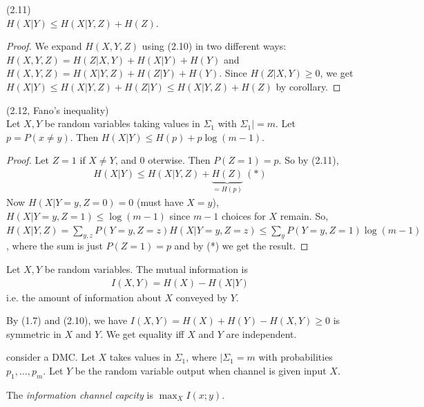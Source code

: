 \documentclass[a4paper]{article}
\begin{document}
\begin{lemma} (2.11)\\
$H(X|Y) \leq H(X|Y,Z) + H(Z)$.
\begin{proof}
We expand $H(X,Y,Z)$ using (2.10) in two different ways:
$H(X,Y,Z) = H(Z|X,Y)+H(X|Y)+H(Y)$ and $H(X,Y,Z)=H(X|Y,Z)+H(Z|Y)+H(Y)$. Since $H(Z|X,Y)\geq 0$, we get $H(X|Y)\leq H(X|Y,Z)+H(Z|Y)\leq H(X|Y,Z)+H(Z)$ by corollary.
\end{proof}
\end{lemma}

\begin{lemma} (2.12, Fano's inequality)\\
Let $X,Y$ be random variables taking values in $\Sigma_1$ with $\Sigma_1 | = m$. Let $p = P(x \neq y)$. Then $H(X|Y) \leq H(p) + p\log (m-1)$.
\begin{proof}
Let $Z=1$ if $X\neq Y$, and 0 oterwise. Then $P(Z=1) = p$. So by (2.11),
\begin{equation*}
\begin{aligned}
H(X|Y) \leq H(X|Y,Z)+\underbrace{H(Z)}_{=H(p)} \ (*)
\end{aligned}
\end{equation*}
Now $H(X|Y=y,Z=0) = 0$ (must have $X=y$), $H(X|Y=y,Z=1) \leq \log (m-1)$ since $m-1$ choices for $X$ remain. So, $H(X|Y,Z) = \sum_{y,z} P(Y=y,Z=z) H(X|Y=y,Z=z) \leq \sum_y P(Y=y,Z=1) \log (m-1)$, where the sum is just $P(Z=1)=p$ and by (*) we get the result.
\end{proof}
\end{lemma}

\begin{defi}
Let $X,Y$ be random variables. The mutual information is 
\begin{equation*}
\begin{aligned}
I(X,Y) = H(X)-H(X|Y)
\end{aligned}
\end{equation*}
i.e. the amount of information about $X$ conveyed by $Y$.
\end{defi}

By (1.7) and (2.10), we have $I(X,Y) = H(X)+H(Y)-H(X,Y) \geq 0$ is symmetric in $X$ and $Y$. We get equality iff $X$ and $Y$ are independent.

consider a DMC. Let $X$ takes values in $\Sigma_1$, where $|\Sigma_1 = m$ with probabilities $p_1,...,p_m$. Let $Y$ be the random variable output when channel is given input $X$. 

\begin{defi}
The \emph{information channel capcity} is $\max_X I(x;y)$.
\end{defi}
\end{document}
